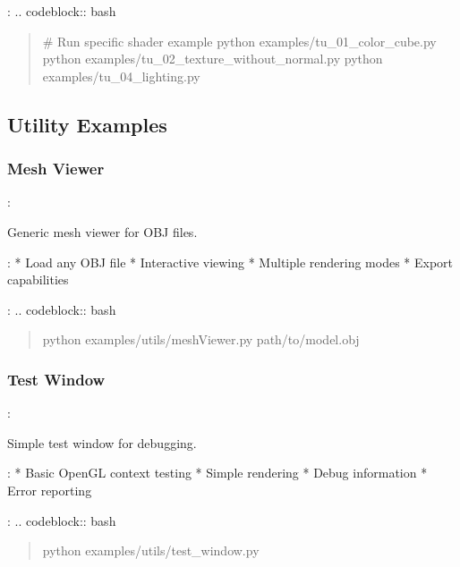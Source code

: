 \documentclass[a4paper,10pt,english,openany,oneside]{sphinxmanual}
\begin{document}
\sphinxAtStartPar
{}:
.. code\sphinxhyphen{}block:: bash
\begin{quote}

\sphinxAtStartPar
\# Run specific shader example
python examples/tu\_01\_color\_cube.py
python examples/tu\_02\_texture\_without\_normal.py
python examples/tu\_04\_lighting.py
\end{quote}


\subsection{Utility Examples}
\label{\detokenize{examples:utility-examples}}

\subsubsection{Mesh Viewer}
\label{\detokenize{examples:mesh-viewer}}
\sphinxAtStartPar
{}: 

\sphinxAtStartPar
Generic mesh viewer for OBJ files.

\sphinxAtStartPar
{}:
* Load any OBJ file
* Interactive viewing
* Multiple rendering modes
* Export capabilities

\sphinxAtStartPar
{}:
.. code\sphinxhyphen{}block:: bash
\begin{quote}

\sphinxAtStartPar
python examples/utils/meshViewer.py path/to/model.obj
\end{quote}


\subsubsection{Test Window}
\label{\detokenize{examples:test-window}}
\sphinxAtStartPar
{}: 

\sphinxAtStartPar
Simple test window for debugging.

\sphinxAtStartPar
{}:
* Basic OpenGL context testing
* Simple rendering
* Debug information
* Error reporting

\sphinxAtStartPar
{}:
.. code\sphinxhyphen{}block:: bash
\begin{quote}

\sphinxAtStartPar
python examples/utils/test\_window.py
\end{quote}
\end{document}
